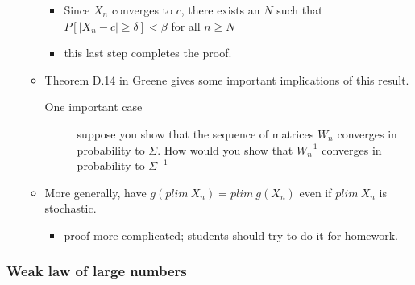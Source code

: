 \documentclass[11pt]{article}
\begin{document}
\begin{enumerate}
\begin{itemize}
\begin{itemize}
\item Since $X_n$ converges to $c$, there exists an $N$
              such that $P[|X_n - c| \geq \delta] < \beta$ for
              all $n \geq N$
\item this last step completes the proof.
\end{itemize}
\item Theorem D.14 in Greene gives some important implications of
            this result.
\begin{description}
\item[One important case] suppose you show that the sequence of
                 matrices $W_n$ converges in probability to $\Sigma$.
                 How would you show that $W_n^{-1}$ converges in
                 probability to $\Sigma^{-1}$
\end{description}
\item More generally, have $g(plim\ X_n) = plim\ g(X_n)$ even if
            $plim\ X_n$ is stochastic.
\begin{itemize}
\item proof more complicated; students should try to do it for
              homework.
\end{itemize}
\end{itemize}
\end{enumerate}
\subsubsection{Weak law of large numbers}
\label{sec-1-3-2}
\end{document}
